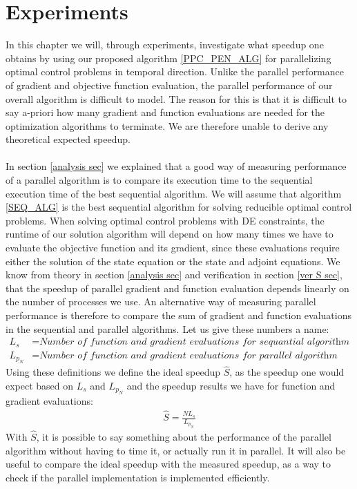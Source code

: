\chapter{Experiments}\label{Experiments chapter}
In this chapter we will, through experiments, investigate what speedup one obtains by using our proposed algorithm \ref{PPC_PEN_ALG} for parallelizing optimal control problems in temporal direction. Unlike the parallel performance of gradient and objective function evaluation, the parallel performance of our overall algorithm is difficult to model. The reason for this is that it is difficult to say a-priori how many gradient and function evaluations are needed for the optimization algorithms to terminate. We are therefore unable to derive any theoretical expected speedup.
\\
\\
In section \ref{analysis sec} we explained that a good way of measuring performance of a parallel algorithm is to compare its execution time to the sequential execution time of the best sequential algorithm. We will assume that algorithm \ref{SEQ_ALG} is the best sequential algorithm for solving reducible optimal control problems. When solving optimal control problems with DE constraints, the runtime of our solution algorithm will depend on how many times we have to evaluate the objective function and its gradient, since these evaluations require either the solution of the state equation or the state and adjoint equations. We know from theory in section \ref{analysis sec} and verification in section \ref{ver S sec}, that the speedup of parallel gradient and function evaluation depends linearly on the number of processes we use. An alternative way of measuring parallel performance is therefore to compare the sum of gradient and function evaluations in the sequential and parallel algorithms. Let us give these numbers a name:
\begin{align*}
L_s &= \textit{Number of function and gradient evaluations for sequantial algorithm}\\
L_{p_N} &= \textit{Number of function and gradient evaluations for parallel algorithm using N processes}
\end{align*} 
Using these definitions we define the ideal speedup $\hat{S}$, as the speedup one would expect based on $L_s$ and $L_{p_N}$ and the speedup results we have for function and gradient evaluations:
\begin{align}
\hat S = \frac{NL_s}{L_{p_N}} \label{ideal S}
\end{align}
With $\hat S$, it is possible to say something about the performance of the parallel algorithm without having to time it, or actually run it in parallel. It will also be useful to compare the ideal speedup with the measured speedup, as a way to check if the parallel implementation is implemented efficiently.
